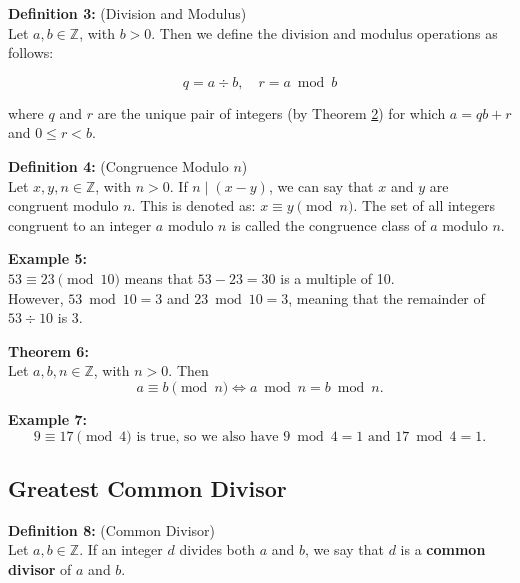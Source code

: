 \documentclass[12pt]{article}
\begin{document}
\vspace{5mm}

\noindent\textbf{Definition 3:} (Division and Modulus)
\label{def:divmod}
\\Let $a, b \in \mathbb{Z}$, with $b > 0$. 
Then we define the division and modulus operations as follows:

\[
q = a \div b, \quad r = a \bmod b
\]

where $q$ and $r$ are the unique pair of integers (by Theorem \hyperref[thm:division]{2}) for which $a = qb + r$ and $0 \leq r < b$.

\vspace{5mm}

\noindent\textbf{Definition 4:} (Congruence Modulo $n$)
\label{def:congruence}
\\Let $x,y,n \in \mathbb{Z}$, with $n > 0$. If $n \mid (x - y)$, we can say that $x$ and $y$ are congruent modulo $n$. 
This is denoted as: $x \equiv y \pmod{n}$.
The set of all integers congruent to an integer $a$ modulo $n$ is called the congruence class of $a$ modulo $n$.

\vspace{5mm}

\noindent\textbf{Example 5:} 
\label{ex:modexample}
\\ $53 \equiv 23 \pmod{10}$ means that $53-23=30$ is a multiple of 10. 
\\However, $53 \bmod 10 = 3$ and $23 \bmod 10 = 3$, meaning that the remainder of $53 \div 10$ is $3$.

\vspace{5mm}

\noindent\textbf{Theorem 6:} 
\label{thm:modiff}
\\Let $a,b,n \in \mathbb{Z}$, with $n > 0$. 
Then 
\[
a \equiv b \pmod{n} \iff a \bmod n = b \bmod n.
\]

\vspace{5mm}

\noindent\textbf{Example 7:}
\label{ex:modexample2}
\[
9 \equiv 17 \pmod{4} \text{ is true, so we also have } 
9\bmod 4 = 1 \text{ and } 17 \bmod 4 = 1.
\]

\vspace{15mm}

\subsection{Greatest Common Divisor}

\noindent\textbf{Definition 8:} (Common Divisor)
\label{def:commondivisor}
\\Let $a,b \in \mathbb{Z}$. If an integer $d$ divides both $a$ and $b$, we say that $d$ is a \textbf{common divisor} of $a$ and $b$.
\end{document}
